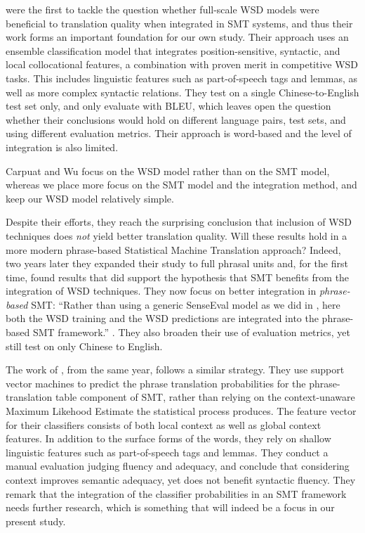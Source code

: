 \cite{CarpuatWu05} were the first to tackle the question whether full-scale WSD
models were beneficial to translation quality when integrated in SMT systems,
and thus their work forms an important foundation for our own study.  Their
approach uses an ensemble classification model that integrates
position-sensitive, syntactic, and local collocational features, a combination
with proven merit in competitive WSD tasks. This includes linguistic features
such as part-of-speech tags and lemmas, as well as more complex syntactic
relations.  They test on a single Chinese-to-English test set only, and only
evaluate with BLEU, which leaves open the question whether their conclusions
would hold on different language pairs, test sets, and using different
evaluation metrics.  Their approach is word-based and the level of
integration is also limited.

Carpuat and Wu focus on the WSD model rather than on the SMT
model, whereas we place more focus on the SMT model and the
integration method, and keep our WSD model relatively
simple.

Despite their efforts, they reach the surprising conclusion that inclusion of
WSD techniques does \emph{not} yield better translation quality. Will these
results hold in a more modern phrase-based Statistical Machine Translation
approach? Indeed, two years later they expanded their study to full phrasal units
\citep{CarpuatWu07} and, for the first time, found results that did support the
hypothesis that SMT benefits from the integration of WSD techniques. They now
focus on better integration in \emph{phrase-based} SMT: ``Rather than using a
generic SenseEval model as we did in \cite{CarpuatWu05}, here both the WSD
training and the WSD predictions are integrated into the phrase-based SMT
framework.'' \citep{CarpuatWu07}. They also broaden their use of evaluation
metrics, yet still test on only Chinese to English.

The work of \cite{Gimenez+07}, from the same year, follows a similar
strategy. They use support vector machines to predict the phrase
translation probabilities for the phrase-translation table component
of SMT, rather than relying on the context-unaware Maximum Likehood
Estimate the statistical process produces. The feature vector for
their classifiers consists of both local context as well as global
context features.  In addition to the surface forms of the words, they
rely on shallow linguistic features such as part-of-speech tags and
lemmas. They conduct a manual evaluation judging fluency and
adequacy, and conclude that considering context improves semantic
adequacy, yet does not benefit syntactic fluency. They remark that the
integration of the classifier probabilities in an SMT framework needs
further research, which is something that will indeed be a focus in
our present study.

